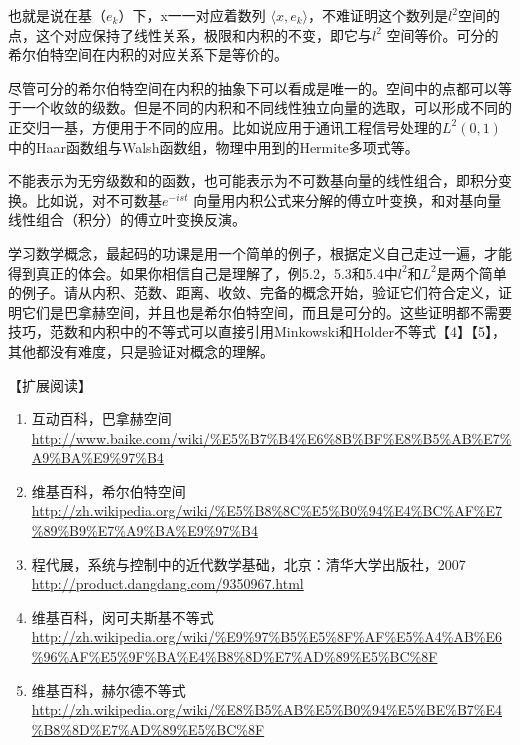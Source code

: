 也就是说在基（$ e_k $）下，x一一对应着数列 $ \langle x, e_k \rangle $，不难证明这个数列是$ l^2 $空间的点，这个对应保持了线性关系，极限和内积的不变，即它与$ l^2 $ 空间等价。可分的希尔伯特空间在内积的对应关系下是等价的。

尽管可分的希尔伯特空间在内积的抽象下可以看成是唯一的。空间中的点都可以等于一个收敛的级数。但是不同的内积和不同线性独立向量的选取，可以形成不同的正交归一基，方便用于不同的应用。比如说应用于通讯工程信号处理的$ L^2(0,1) $中的Haar函数组与Walsh函数组，物理中用到的Hermite多项式等。

不能表示为无穷级数和的函数，也可能表示为不可数基向量的线性组合，即积分变换。比如说，对不可数基$ e^{−ist} $ 向量用内积公式来分解的傅立叶变换，和对基向量线性组合（积分）的傅立叶变换反演。

学习数学概念，最起码的功课是用一个简单的例子，根据定义自己走过一遍，才能得到真正的体会。如果你相信自己是理解了，例5.2，5.3和5.4中$ l^2 $和$ L^2 $是两个简单的例子。请从内积、范数、距离、收敛、完备的概念开始，验证它们符合定义，证明它们是巴拿赫空间，并且也是希尔伯特空间，而且是可分的。这些证明都不需要技巧，范数和内积中的不等式可以直接引用Minkowski和Holder不等式【4】【5】，其他都没有难度，只是验证对概念的理解。

【扩展阅读】
\begin{enumerate}
	\item 互动百科，巴拿赫空间 \url{http://www.baike.com/wiki/\%E5\%B7\%B4\%E6\%8B\%BF\%E8\%B5\%AB\%E7\%A9\%BA\%E9\%97\%B4} 
	
	\item 维基百科，希尔伯特空间\url{http://zh.wikipedia.org/wiki/\%E5\%B8\%8C\%E5\%B0\%94\%E4\%BC\%AF\%E7\%89\%B9\%E7\%A9\%BA\%E9\%97\%B4}
	
	\item 程代展，系统与控制中的近代数学基础，北京：清华大学出版社，2007 \url{http://product.dangdang.com/9350967.html}
	
	\item 维基百科，闵可夫斯基不等式\url{http://zh.wikipedia.org/wiki/\%E9\%97\%B5\%E5\%8F\%AF\%E5\%A4\%AB\%E6\%96\%AF\%E5\%9F\%BA\%E4\%B8\%8D\%E7\%AD\%89\%E5\%BC\%8F}
	
	\item 维基百科，赫尔德不等式\url{http://zh.wikipedia.org/wiki/\%E8\%B5\%AB\%E5\%B0\%94\%E5\%BE\%B7\%E4\%B8\%8D\%E7\%AD\%89\%E5\%BC\%8F}
\end{enumerate}




